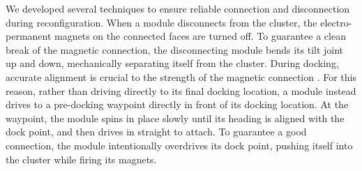 \documentclass[journal]{IEEEtran}
\begin{document}

We developed several techniques to ensure reliable connection and disconnection during reconfiguration.  
When a module disconnects from the cluster, the electro-permanent magnets on the connected faces are turned off.  To guarantee a clean break of the magnetic connection, the disconnecting module bends its tilt joint up and down, mechanically separating itself from the cluster. During docking, accurate alignment is crucial to the strength of the magnetic connection \cite{tosun2016design}.  For this reason, rather than driving directly to its final docking location, a module instead drives to a pre-docking waypoint directly in front of its docking location.  At the waypoint, the module spins in place slowly until its heading is aligned with the dock point, and then drives in straight to attach. To guarantee a good connection, the module intentionally overdrives its dock point, pushing itself into the cluster while firing its magnets.
%
\end{document}
